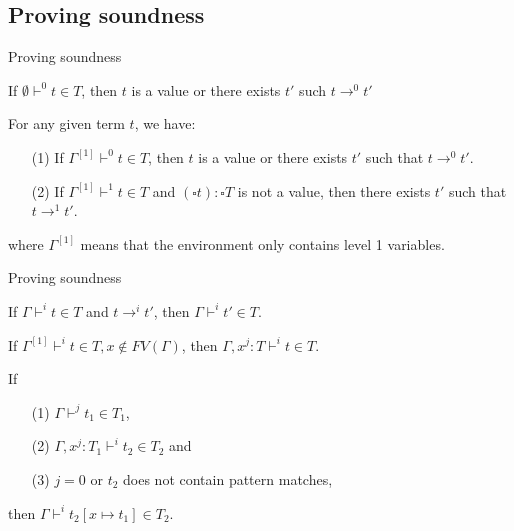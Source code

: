 \documentclass{beamer}
\begin{document}
\subsection{Proving soundness}
\begin{frame}{Proving soundness}
\begin{theorem}[Progress]
  If $\emptyset \vdash^0 t \in T$, then $t$ is a value or there exists $t'$ such $t \longrightarrow^0 t'$ 
\end{theorem}

\begin{lemma}
  For any given term $t$, we have:
  \begin{itemize}
    \item[(1)]  If $\Gamma^{[1]} \vdash^0 t \in T$, then $t$ is a value or  there exists $t'$ such that $t \longrightarrow^0 t'$.
    \item[(2)] If $\Gamma^{[1]} \vdash^1 t \in T$ and $(\square t) : \square T$ is not a value,  then there exists $t'$ such that $t \longrightarrow^1 t'$.
  \end{itemize}
where $\Gamma^{[1]}$ means that the environment only contains level 1 variables.
\end{lemma}
\end{frame}

\begin{frame}{Proving soundness}

\begin{theorem}[Preservation]
  If $\Gamma \vdash^i t \in T$ and $t \longrightarrow^i t'$, then $\Gamma \vdash^i t' \in T$.
\end{theorem}

\begin{lemma}[Weakening]
  If $\Gamma^{[1]} \vdash^i t \in T, x \not\in FV(\Gamma)$, then $\Gamma, x^j : T \vdash^i t \in T$.
\end{lemma}

\begin{lemma}[Substitution]
  If 
  \begin{itemize}
    \item[(1)] $\Gamma \vdash^j t_1 \in T_1$,
    \item[(2)] $\Gamma, x^j : T_1 \vdash^i t_2 \in T_2$ and
    \item[(3)] $j = 0$ or $t_2$ does not contain pattern matches,
  \end{itemize}
then $\Gamma \vdash^i t_2[x \mapsto t_1] \in T_2$.
\end{lemma}

\end{frame}
\end{document}
